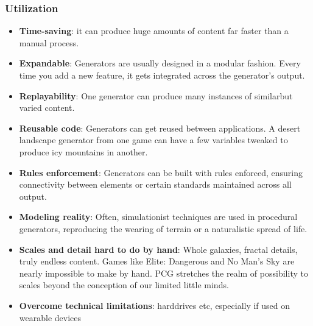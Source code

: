 \documentclass[MGS,Master,english]{twbook}%
\begin{document}
\subsubsection{Utilization}
\begin{itemize}
	\item \textbf{Time-saving}: it can produce huge amounts of content far faster than a manual process. \cite{pcg::inGameDesign}
	\item \textbf{Expandable}: Generators are usually designed in a modular fashion. Every time you add a new feature, it gets integrated across the generator’s output. \cite{pcg::inGameDesign}
	\item \textbf{Replayability}: One generator can produce many instances of similarbut varied content. \cite{pcg::inGameDesign}
	\item \textbf{Reusable code}: Generators can get reused between applications. A desert landscape generator from one game can have a few variables tweaked to produce icy mountains in another. \cite{pcg::inGameDesign}
	\item \textbf{Rules enforcement}: Generators can be built with rules enforced, ensuring connectivity between elements or certain standards maintained across all output. \cite{pcg::inGameDesign}
	\item \textbf{Modeling reality}: Often, simulationist techniques are used in procedural generators, reproducing the wearing of terrain or a naturalistic spread of life. \cite{pcg::inGameDesign}
	\item \textbf{Scales and detail hard to do by hand}: Whole galaxies, fractal details, truly endless content. Games like Elite: Dangerous and No Man’s Sky are nearly impossible to make by hand. PCG stretches the realm of possibility to scales beyond the conception of our limited little minds. \cite{pcg::inGameDesign}
	\item \textbf{Overcome technical limitations}: harddrives etc, especially if used on wearable devices \cite{pcg::inGameDesign}
\end{itemize}
\end{document}
